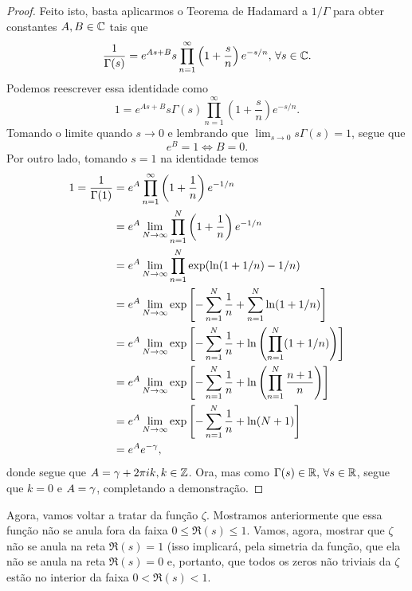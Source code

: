\begin{proof}
        Feito isto, basta aplicarmos o Teorema de Hadamard a $1/\Gamma$ para obter constantes
        $A,B\in\mathbb{C}$ tais que
        \[
        \frac{1}{\Gamma(s)} = e^{As + B}s\prod_{n=1}^{\infty} \left(1 + \frac{s}{n}\right)e^{-s/n}, \,
        \forall s\in\mathbb{C}.
        \]
        Podemos reescrever essa identidade como
        \[
        1 = e^{As + B}s\Gamma(s)\prod_{n=1}^{\infty} \left(1 + \frac{s}{n}\right)e^{-s/n}.
        \]
        Tomando o limite quando $s\to 0$ e lembrando que $\lim_{s\to 0}s\Gamma(s) = 1$, segue que
        \[
        e^B = 1 \iff B = 0.
        \]
        Por outro lado, tomando $s=1$ na identidade temos
        \begin{align*}
            1 = \frac{1}{\Gamma(1)} &= e^A \prod_{n=1}^{\infty} \left(1 + \frac{1}{n}\right)e^{-1/n} \\
                                &= e^A \lim_{N\to\infty}\prod_{n=1}^{N} \left(1 + \frac{1}{n}\right)e^{-1/n} \\
                                &= e^A \lim_{N\to\infty}\prod_{n=1}^{N} \exp(\ln(1+1/n) - 1/n) \\
                                &= e^A \lim_{N\to\infty} \exp\left[ -\sum_{n=1}^N \frac{1}{n} +
                                                \sum_{n=1}^N \ln(1 + 1/n) \right] \\
                                &= e^A \lim_{N\to\infty} \exp\left[ -\sum_{n=1}^N \frac{1}{n} +
                                                \ln\left( \prod_{n=1}^N (1 + 1/n) \right) \right] \\
                                &= e^A \lim_{N\to\infty} \exp\left[ -\sum_{n=1}^N \frac{1}{n} +
                                                \ln\left( \prod_{n=1}^N \frac{n+1}{n} \right) \right] \\
                                &= e^A \lim_{N\to\infty} \exp\left[ -\sum_{n=1}^N \frac{1}{n} +
                                                \ln(N+1) \right] \\
                                &= e^Ae^{-\gamma},
        \end{align*}
        donde segue que $A = \gamma + 2\pi ik, k\in\mathbb{Z}$. Ora, mas como $\Gamma(s)\in\mathbb{R}, \, \forall s\in\mathbb{R}$,
        segue que $k = 0$ e $A = \gamma$, completando a demonstração.
    \end{proof}
    
    \medskip
    
    Agora, vamos voltar a tratar da função $\zeta$. Mostramos
    anteriormente que essa função não se anula fora da faixa
    $0 \leq \Re(s) \leq 1$. Vamos, agora, mostrar que
    $\zeta$ não se anula na reta $\Re(s) = 1$ (isso implicará,
    pela simetria da função, que ela não se anula na reta 
    $\Re(s) = 0$ e, portanto, que todos os zeros não triviais
    da $\zeta$ estão no interior da faixa $0<\Re(s)<1$.
    
